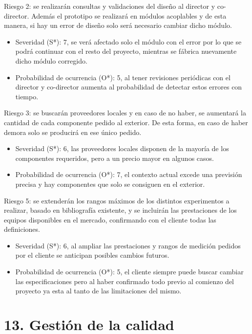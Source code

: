 \documentclass[11pt]{charter}
\begin{document}
Riesgo 2: se realizarán consultas y validaciones del diseño al director y co-director. Además el prototipo se realizará en módulos acoplables y de esta manera, si hay un error de diseño solo será necesario cambiar dicho módulo.
\begin{itemize}
\item Severidad (S*): 7, se verá afectado solo el módulo con el error por lo que se podrá continuar con el resto del proyecto, mientras se fábrica nuevamente dicho módulo corregido.
\item Probabilidad de ocurrencia (O*): 5, al tener revisiones periódicas con el director y co-director aumenta al probabilidad de detectar estos errores con tiempo.
\end{itemize}
Riesgo 3: se buscarán proveedores locales y en caso de no haber, se aumentará la cantidad de cada componente pedido al exterior. De esta forma, en caso de haber demora solo se producirá en ese único pedido.
\begin{itemize}
\item Severidad (S*): 6, las proveedores locales disponen de la mayoría de los componentes requeridos, pero a un precio mayor en algunos casos.
\item Probabilidad de ocurrencia (O*): 7, el contexto actual excede una previsión precisa y hay componentes que solo se consiguen en el exterior.
\end{itemize}
Riesgo 5: se extenderán los rangos máximos de los distintos experimentos a realizar, basado en bibliografía existente, y se incluirán las prestaciones de los equipos disponibles en el mercado, confirmando con el cliente todas las definiciones.
\begin{itemize}
\item Severidad (S*): 6, al ampliar las prestaciones y rangos de medición pedidos por el cliente se anticipan posibles cambios futuros.
\item Probabilidad de ocurrencia (O*): 5, el cliente siempre puede buscar cambiar las especificaciones pero al haber confirmado todo previo al comienzo del proyecto ya esta al tanto de las limitaciones del mismo.
\end{itemize}

\section{13. Gestión de la calidad}
\label{sec:calidad}
\end{document}
